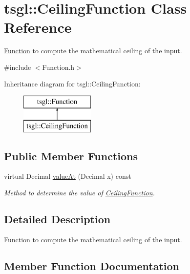 \hypertarget{classtsgl_1_1_ceiling_function}{}\section{tsgl\+:\+:Ceiling\+Function Class Reference}
\label{classtsgl_1_1_ceiling_function}


\hyperlink{classtsgl_1_1_function}{Function} to compute the mathematical ceiling of the input.  




{\ttfamily \#include $<$Function.\+h$>$}

Inheritance diagram for tsgl\+:\+:Ceiling\+Function\+:\begin{figure}[H]
\begin{center}
\leavevmode
\includegraphics[height=2.000000cm]{classtsgl_1_1_ceiling_function}
\end{center}
\end{figure}
\subsection*{Public Member Functions}
\begin{DoxyCompactItemize}
\item 
virtual Decimal \hyperlink{classtsgl_1_1_ceiling_function_a01487798ff6e2adc9481177e96e4e89c}{value\+At} (Decimal x) const
\begin{DoxyCompactList}\small\item\em Method to determine the value of \hyperlink{classtsgl_1_1_ceiling_function}{Ceiling\+Function}. \end{DoxyCompactList}\end{DoxyCompactItemize}


\subsection{Detailed Description}
\hyperlink{classtsgl_1_1_function}{Function} to compute the mathematical ceiling of the input. 

\subsection{Member Function Documentation}
\mbox{\label{classtsgl_1_1_ceiling_function_a01487798ff6e2adc9481177e96e4e89c}} 
